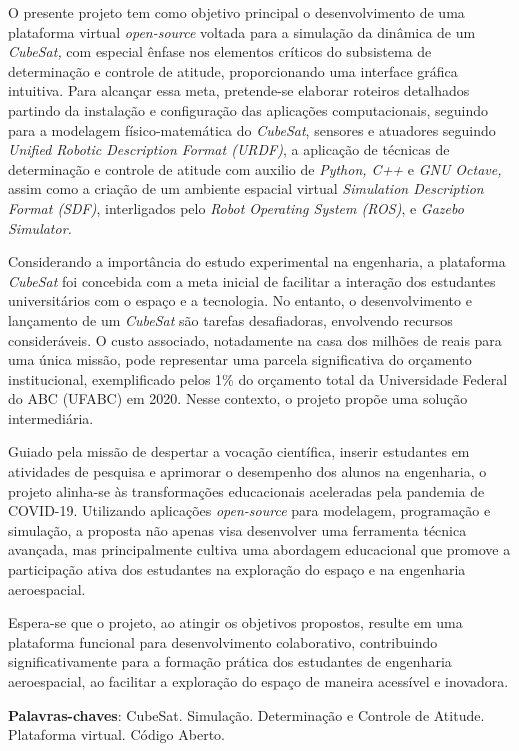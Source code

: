 
\setlength{\absparsep}{18pt} %
\begin{resumo}

O presente projeto tem como objetivo principal o desenvolvimento de uma plataforma virtual \textit{open-source} voltada para a simulação da dinâmica de um \textit{CubeSat,} com especial ênfase nos elementos críticos do subsistema de determinação e controle de atitude, proporcionando uma interface gráfica intuitiva. Para alcançar essa meta, pretende-se elaborar roteiros detalhados partindo da instalação e configuração das aplicações computacionais, seguindo para a modelagem físico-matemática do \textit{CubeSat}, sensores e atuadores seguindo \textit{Unified Robotic Description Format (URDF)}, a aplicação de técnicas de determinação e controle de atitude com auxilio de \textit{Python, C++ }e \textit{GNU Octave,} assim como a criação de um ambiente espacial virtual \textit{Simulation Description Format (SDF)}, interligados pelo \textit{Robot Operating System (ROS)}, e \textit{Gazebo Simulator.}

Considerando a importância do estudo experimental na engenharia, a plataforma \textit{CubeSat} foi concebida com a meta inicial de facilitar a interação dos estudantes universitários com o espaço e a tecnologia. No entanto, o desenvolvimento e lançamento de um \textit{CubeSat} são tarefas desafiadoras, envolvendo recursos consideráveis. O custo associado, notadamente na casa dos milhões de reais para uma única missão, pode representar uma parcela significativa do orçamento institucional, exemplificado pelos 1\% do orçamento total da Universidade Federal do ABC (UFABC) em 2020. Nesse contexto, o projeto propõe uma solução intermediária.

Guiado pela missão de despertar a vocação científica, inserir estudantes em atividades de pesquisa e aprimorar o desempenho dos alunos na engenharia, o projeto alinha-se às transformações educacionais aceleradas pela pandemia de COVID-19. Utilizando aplicações \textit{open-source} para modelagem, programação e simulação, a proposta não apenas visa desenvolver uma ferramenta técnica avançada, mas principalmente cultiva uma abordagem educacional que promove a participação ativa dos estudantes na exploração do espaço e na engenharia aeroespacial.

Espera-se que o projeto, ao atingir os objetivos propostos, resulte em uma plataforma funcional para desenvolvimento colaborativo, contribuindo significativamente para a formação prática dos estudantes de engenharia aeroespacial, ao facilitar a exploração do espaço de maneira acessível e inovadora.


 \textbf{Palavras-chaves}: CubeSat. Simulação. Determinação e Controle de Atitude. Plataforma virtual. Código Aberto.
\end{resumo}

